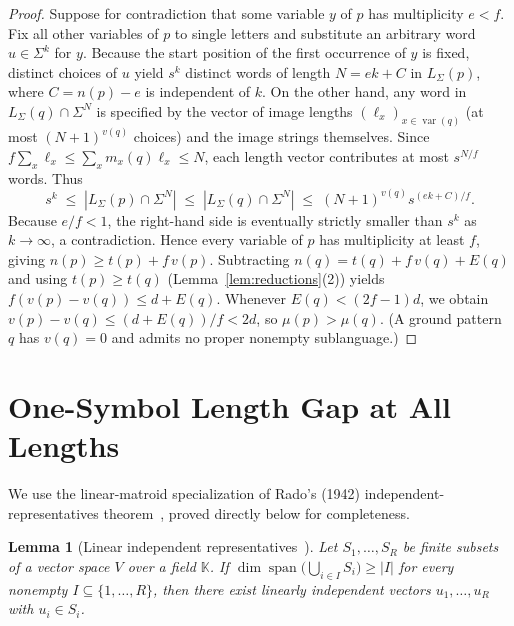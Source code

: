 \documentclass[11pt]{article}
\theoremstyle{plain}
\newtheorem{lemma}[theorem]{Lemma}
\theoremstyle{definition}
\theoremstyle{remark}
\DeclareMathOperator{\var}{var}
\DeclareMathOperator{\spn}{span}
\begin{document}
\begin{proof}
Suppose for contradiction that some variable $y$ of $p$ has multiplicity $e < f$.
Fix all other variables of $p$ to single letters and substitute an arbitrary word $u \in \Sigma^k$ for $y$.
Because the start position of the first occurrence of $y$ is fixed, distinct choices of $u$ yield $s^k$ distinct words of length $N = ek + C$ in $L_\Sigma(p)$, where $C = n(p) - e$ is independent of $k$.
On the other hand, any word in $L_\Sigma(q) \cap \Sigma^N$ is specified by the vector of image lengths $(\ell_x)_{x \in \var(q)}$ (at most $(N+1)^{v(q)}$ choices) and the image strings themselves.
Since $f \sum_x \ell_x \le \sum_x m_x(q)\ell_x \le N$, each length vector contributes at most $s^{N/f}$ words. Thus
\[
s^k \;\le\; |L_\Sigma(p) \cap \Sigma^N| \;\le\; |L_\Sigma(q) \cap \Sigma^N| \;\le\; (N + 1)^{v(q)} s^{(ek + C)/f}.
\]
Because $e/f < 1$, the right-hand side is eventually strictly smaller than $s^k$ as $k \to \infty$, a contradiction.
Hence every variable of $p$ has multiplicity at least $f$, giving $n(p) \ge t(p) + f\,v(p)$.
Subtracting $n(q) = t(q) + f\,v(q) + E(q)$ and using $t(p) \ge t(q)$ (Lemma~\ref{lem:reductions}(2)) yields $f(v(p) - v(q)) \le d + E(q)$.
Whenever $E(q) < (2f - 1)d$, we obtain $v(p) - v(q) \le (d + E(q))/f < 2d$, so $\mu(p) > \mu(q)$.
(A ground pattern $q$ has $v(q) = 0$ and admits no proper nonempty sublanguage.)
\end{proof}

\section{One-Symbol Length Gap at All Lengths}

We use the linear-matroid specialization of Rado's (1942) independent-representatives theorem~\cite{Rado1942}, proved directly below for completeness.

\begin{lemma}[Linear independent representatives~\cite{Rado1942}]\label{lem:rado}
Let $S_1, \dots, S_R$ be finite subsets of a vector space $V$ over a field $\mathbb{K}$. If $\dim\spn\bigl(\bigcup_{i \in I} S_i\bigr) \ge |I|$ for every nonempty $I \subseteq \{1, \dots, R\}$, then there exist linearly independent vectors $u_1, \dots, u_R$ with $u_i \in S_i$.
\end{lemma}
\end{document}
